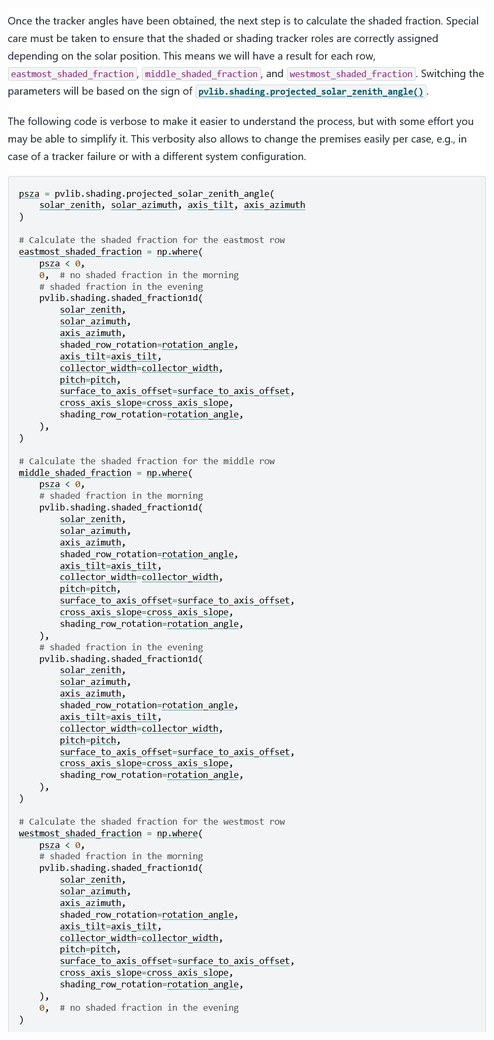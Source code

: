 \begin{myparindent}{0pt}
\includegraphics[width=\linewidth,height=0.9\textheight,keepaspectratio]{images/docs_examples_cut/shaded_fraction_1.png}


\end{myparindent}
